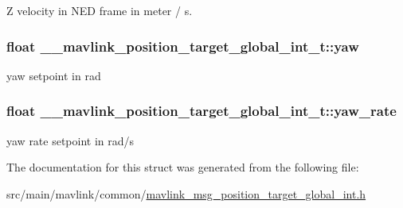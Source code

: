 Z velocity in N\+E\+D frame in meter / s. 

\hypertarget{struct____mavlink__position__target__global__int__t_a81b18710800d7cb3100c77a73bc1a908}{
\subsubsection[{yaw}]{\setlength{\rightskip}{0pt plus 5cm}float \+\_\+\+\_\+mavlink\+\_\+position\+\_\+target\+\_\+global\+\_\+int\+\_\+t\+::yaw}}\label{struct____mavlink__position__target__global__int__t_a81b18710800d7cb3100c77a73bc1a908}


yaw setpoint in rad 

\hypertarget{struct____mavlink__position__target__global__int__t_a6c4f587a649a0bc0b35087a7de515ab1}{
\subsubsection[{yaw\+\_\+rate}]{\setlength{\rightskip}{0pt plus 5cm}float \+\_\+\+\_\+mavlink\+\_\+position\+\_\+target\+\_\+global\+\_\+int\+\_\+t\+::yaw\+\_\+rate}}\label{struct____mavlink__position__target__global__int__t_a6c4f587a649a0bc0b35087a7de515ab1}


yaw rate setpoint in rad/s 



The documentation for this struct was generated from the following file\+:\begin{DoxyCompactItemize}
\item 
src/main/mavlink/common/\hyperlink{mavlink__msg__position__target__global__int_8h}{mavlink\+\_\+msg\+\_\+position\+\_\+target\+\_\+global\+\_\+int.\+h}\end{DoxyCompactItemize}
